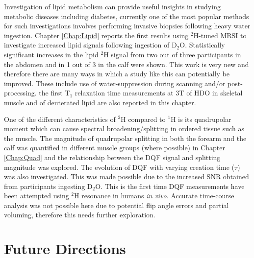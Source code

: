 Investigation of lipid metabolism can provide useful insights in studying metabolic diseases including diabetes, currently one of the most popular methods for such investigations involves performing invasive biopsies following heavy water ingestion. Chapter \ref{Chap:Lipid} reports the first results using $^2$H-tuned MRSI to investigate increased lipid signals following ingestion of D$_2$O. Statistically significant increases in the lipid $^2$H signal from two out of three participants in the abdomen and in 1 out of 3 in the calf were shown. This work is very new and therefore there are many ways in which a study like this can potentially be improved. These include use of water-suppression during scanning and/or post-processing. the first T$_1$ relaxation time measurements at 3T of \ac{HDO} in skeletal muscle and of deuterated lipid are also reported in this chapter.

One of the different characteristics of $^2$H compared to $^1$H is its quadrupolar moment which can cause spectral broadening/splitting in ordered tissue such as the muscle. The magnitude of quadrupolar splitting in both the forearm and the calf was quantified in different muscle groups (where possible) in Chapter \ref{Chap:Quad} and the relationship between the \ac{DQF} signal and splitting magnitude was explored. The evolution of \ac{DQF} with varying creation time ($\tau$) was also investigated. This was made possible due to the increased \ac{SNR} obtained from participants ingesting D$_2$O. This is the first time \ac{DQF} measurements have been attempted using $^2$H resonance in humans \textit{in vivo}. Accurate time-course analysis was not possible here due to potential flip angle errors and partial voluming, therefore this needs further exploration.

\section{Future Directions}

